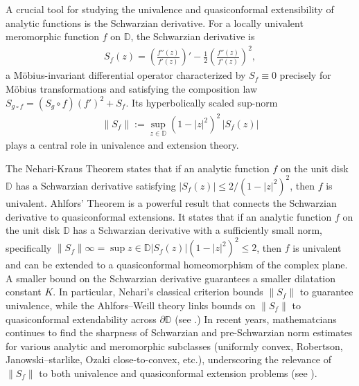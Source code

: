 \documentclass[a4paper,12pt]{amsart}
\theoremstyle{plain}
\theoremstyle{definition}
\begin{document}
A crucial tool for studying the univalence and quasiconformal extensibility of analytic functions is the Schwarzian derivative. For a locally univalent meromorphic function $f$ on $\mathbb{D}$, the Schwarzian derivative is
\begin{align*}
	S_f(z)=\left(\frac{f''(z)}{f'(z)}\right)' - \frac12\left(\frac{f''(z)}{f'(z)}\right)^2,
\end{align*}
a M\"obius-invariant differential operator characterized by $S_f\equiv 0$ precisely for M\"obius transformations and satisfying the composition law $S_{g\circ f}=(S_g\circ f)(f')^2+S_f$. Its hyperbolically scaled sup-norm
\begin{align*}
	\|S_f\| := \sup_{z\in\mathbb{D}} (1-|z|^2)^2\,|S_f(z)|
\end{align*}
plays a central role in univalence and extension theory. \vspace{2mm} 

The Nehari-Kraus Theorem states that if an analytic function $f$ on the unit disk $\mathbb{D}$ has a Schwarzian derivative satisfying $|S_f(z)| \leq 2/(1-|z|^2)^2$, then $f$ is univalent. Ahlfors' Theorem is a powerful result that connects the Schwarzian derivative to quasiconformal extensions. It states that if an analytic function $f$ on the unit disk $\mathbb{D}$ has a Schwarzian derivative with a sufficiently small norm, specifically $\|S_f\|\infty = \sup{z \in \mathbb{D}} |S_f(z)|(1-|z|^2)^2 \leq 2$, then $f$ is univalent and can be extended to a quasiconformal homeomorphism of the complex plane. A smaller bound on the Schwarzian derivative guarantees a smaller dilatation constant $K$. In particular, Nehari’s classical criterion bounds $\|S_f\|$ to guarantee univalence, while the Ahlfors–Weill theory links bounds on $\|S_f\|$ to quasiconformal extendability across $\partial\mathbb{D}$ (see \cite{Nehari-1949,Ahlfors-Weill-1962,Pommerenke-1975,Lehto-1987}.) In recent years, mathematcians continues to find the sharpness of Schwarzian and pre-Schwarzian norm estimates for various analytic and meromorphic subclasses (uniformly convex, Robertson, Janowski–starlike, Ozaki close-to-convex, etc.), underscoring the relevance of $\|S_f\|$ to both univalence and quasiconformal extension problems (see \cite{Agrawal-Sahoo-2020}).
\end{document}
